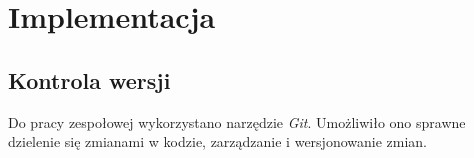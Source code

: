 \section{Implementacja}
\subsection{Kontrola wersji}
Do pracy zespołowej wykorzystano narzędzie \textit{Git}. Umożliwiło ono sprawne dzielenie się zmianami w kodzie, zarządzanie i wersjonowanie zmian.







